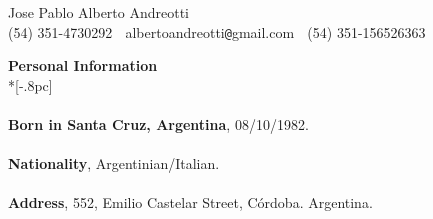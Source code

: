 \documentclass[a4paper,11pt,english]{article}
\begin{document}
\begin{center}
{\Large Jose Pablo Alberto Andreotti} \\[.5pc]
(54) 351-4730292 $\;$ albertoandreotti\verb|@|gmail.com $\;$ (54) 351-156526363 \\[3pc]
\end{center}
{\large \bf Personal Information} \\*[-.8pc]
\underline{\hspace{6in}} \\
\\
{\bf Born in Santa Cruz, Argentina}, 08/10/1982.\\
\\
{\bf Nationality}, Argentinian/Italian.\\
\\
{\bf Address}, 552, Emilio Castelar Street, C\'ordoba. Argentina.\\
\end{document}
